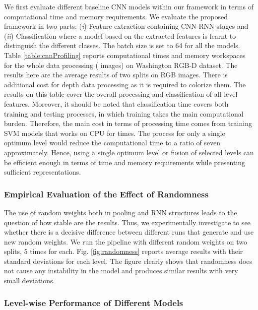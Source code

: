 \documentclass[10pt,journal,compsoc]{IEEEtran}
\begin{document}
We first evaluate different baseline CNN models within our framework in terms of computational time and memory requirements. We evaluate the proposed framework in two parts: (\textit{i}) Feature extraction containing CNN-RNN stages and (\textit{ii}) Classification where a model based on the extracted features is learnt to distinguish the different classes. The batch size is set to 64 for all the models. Table \ref{table:cnnProfiling} reports computational times and memory workspaces for the whole data processing ( images) on Washington RGB-D dataset. The results here are the average results of two splits on RGB images. There is additional cost for depth data processing as it is required to colorize them. The results on this table cover the overall processing and classification of all  level features. Moreover, it should be noted that classification time covers both training and testing processes, in which training takes the main computational burden. Therefore, the main cost in terms of processing time comes from training SVM models that works on CPU for  times. The process for only a single optimum level would reduce the computational time to a ratio of seven approximately. Hence, using a single optimum level or fusion of selected levels can be efficient enough in terms of time and memory requirements while presenting sufficient representations.

\subsubsection{Empirical Evaluation of the Effect of Randomness} \label{sec.exp.ma.randomness}

The use of random weights both in pooling and RNN structures leads to the question of how stable are the results. Thus, we experimentally investigate to see whether there is a decisive difference between different runs that generate and use new random weights. We run the pipeline with different random weights on two splits, 5 times for each. Fig. \ref{fig:randomness} reports average results with their standard deviations for each level. The figure clearly shows that randomness does not cause any instability in the model and produces similar results with very small deviations.

\subsubsection{Level-wise Performance of Different Models} \label{sec.exp.ma.levelPerformances}
\end{document}
